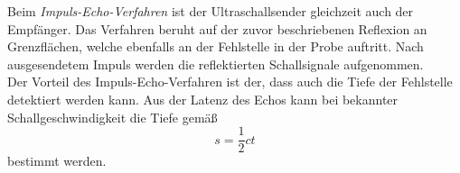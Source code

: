Beim \textit{Impuls-Echo-Verfahren} ist der Ultraschallsender gleichzeit auch der Empfänger. Das Verfahren
beruht auf der zuvor beschriebenen Reflexion an Grenzflächen, welche ebenfalls an der Fehlstelle in
der Probe auftritt. Nach ausgesendetem Impuls werden die reflektierten Schallsignale aufgenommen.
\\
Der Vorteil des Impuls-Echo-Verfahren ist der, dass auch die Tiefe der Fehlstelle detektiert
werden kann. Aus der Latenz des Echos kann bei bekannter Schallgeschwindigkeit die Tiefe gemäß
\begin{equation}
	\label{eqn:tiefe_fehlstelle}
	s = \frac12 ct
\end{equation}
bestimmt werden.

\cite{sample}